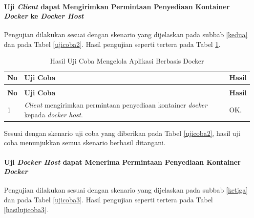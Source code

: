 \paragraph{Uji \textit{Client} dapat Mengirimkan Permintaan Penyediaan Kontainer \textit{Docker} ke \textit{Docker Host}}
Pengujian dilakukan sesuai dengan skenario yang dijelaskan pada subbab \ref{kedua} dan pada Tabel \ref{ujicoba2}. Hasil pengujian seperti tertera pada Tabel \ref{hasilujicoba2}.

\begin{longtable}{|p{}|p{}|p{}|}					\caption{Hasil Uji Coba \textit{Client} dapat Mengirimkan Permintaan Penyediaan Kontainer \textit{Docker} ke \textit{Docker Host}} \label{hasilujicoba2} \\
	\hline
	\textbf{No} & \textbf{Uji Coba} & \textbf{Hasil} \\ \hline
	\endfirsthead
	\caption[]{Hasil Uji Coba Mengelola Aplikasi Berbasis Docker} \\
	\hline
	\textbf{No} & \textbf{Uji Coba} & \textbf{Hasil} \\ \hline
	\endhead
	\endfoot
	\endlastfoot
	
	1 & \textit{Client} mengirimkan permintaan penyediaan kontainer \textit{docker} kepada \textit{docker host}. & OK. \\ \hline
\end{longtable}
Sesuai dengan skenario uji coba  yang diberikan pada Tabel \ref{ujicoba2}, hasil uji coba menunjukkan semua skenario berhasil ditangani.

\paragraph{Uji \textit{Docker Host} dapat Menerima Permintaan Penyediaan Kontainer \textit{Docker}}
Pengujian dilakukan sesuai dengan skenario yang dijelaskan pada subbab \ref{ketiga} dan pada Tabel \ref{ujicoba3}. Hasil pengujian seperti tertera pada Tabel \ref{hasilujicoba3}.

